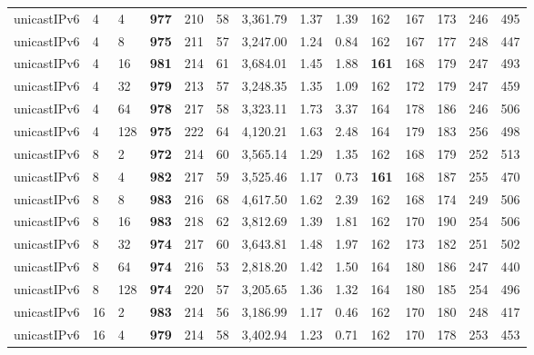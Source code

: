 \begin{table}[!htb]
\begin{tabular}{@{}llllllllllllll@{}}
		unicastIPv6 & 4            & 4     & \textbf{977}  & 210  & 58  & 3,361.79 & 1.37     & 1.39     & 162 & 167 & 173 & 246 & 495  \\
		unicastIPv6 & 4            & 8     & \textbf{975}  & 211  & 57  & 3,247.00 & 1.24     & 0.84     & 162 & 167 & 177 & 248 & 447  \\
		unicastIPv6 & 4            & 16    & \textbf{981}  & 214  & 61  & 3,684.01 & 1.45     & 1.88     & \textbf{161} & 168 & 179 & 247 & 493  \\
		unicastIPv6 & 4            & 32    & \textbf{979}  & 213  & 57  & 3,248.35 & 1.35     & 1.09     & 162 & 172 & 179 & 247 & 459  \\
		unicastIPv6 & 4            & 64    & \textbf{978}  & 217  & 58  & 3,323.11 & 1.73     & 3.37     & 164 & 178 & 186 & 246 & 506  \\
		unicastIPv6 & 4            & 128   & \textbf{975}  & 222  & 64  & 4,120.21 & 1.63     & 2.48     & 164 & 179 & 183 & 256 & 498  \\ \hline
		unicastIPv6 & 8            & 2     & \textbf{972}  & 214  & 60  & 3,565.14 & 1.29     & 1.35     & 162 & 168 & 179 & 252 & 513  \\
		unicastIPv6 & 8            & 4     & \textbf{982}  & 217  & 59  & 3,525.46 & 1.17     & 0.73     & \textbf{161} & 168 & 187 & 255 & 470  \\
		unicastIPv6 & 8            & 8     & \textbf{983}  & 216  & 68  & 4,617.50 & 1.62     & 2.39     & 162 & 168 & 174 & 249 & 506  \\
		unicastIPv6 & 8            & 16    & \textbf{983}  & 218  & 62  & 3,812.69 & 1.39     & 1.81     & 162 & 170 & 190 & 254 & 506  \\
		unicastIPv6 & 8            & 32    & \textbf{974}  & 217  & 60  & 3,643.81 & 1.48     & 1.97     & 162 & 173 & 182 & 251 & 502  \\
		unicastIPv6 & 8            & 64    & \textbf{974}  & 216  & 53  & 2,818.20 & 1.42     & 1.50     & 164 & 180 & 186 & 247 & 440  \\
		unicastIPv6 & 8            & 128   & \textbf{974}  & 220  & 57  & 3,205.65 & 1.36     & 1.32     & 164 & 180 & 185 & 254 & 496  \\ \hline
		unicastIPv6 & 16           & 2     & \textbf{983}  & 214  & 56  & 3,186.99 & 1.17     & 0.46     & 162 & 170 & 180 & 248 & 417  \\
		unicastIPv6 & 16           & 4     & \textbf{979}  & 214  & 58  & 3,402.94 & 1.23     & 0.71     & 162 & 170 & 178 & 253 & 453  \\

\end{tabular}
\end{table}
